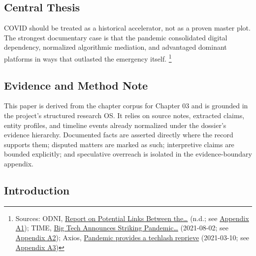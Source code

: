 \documentclass[
  american,
  11pt,
  letterpaper,
]{article}
\begin{document}
\subsection{Central Thesis}\label{central-thesis}

COVID should be treated as a historical accelerator, not as a proven
master plot. The strongest documentary case is that the pandemic
consolidated digital dependency, normalized algorithmic mediation, and
advantaged dominant platforms in ways that outlasted the emergency
itself. \footnote{Sources: ODNI,
  \href{https://www.dni.gov/files/ODNI/documents/assessments/Report-on-Potential-Links-Between-the-Wuhan-Institute-of-Virology-and-the-Origins-of-COVID-19-20230623.pdf}{Report
  on Potential Links Between the\ldots{}} (n.d.; see
  \hyperref[appendix-a1-report-on-potential-links-between-the-wuhan-institute-of-virology-and-the-origins-of-covid-19]{Appendix
  A1}); TIME,
  \href{https://time.com/6085674/big-tech-apple-microsoft-facebook-amazon-google-earnings/}{Big
  Tech Announces Striking Pandemic\ldots{}} (2021-08-02; see
  \hyperref[appendix-a2-big-tech-announces-striking-pandemic-gains-as-small-businesses-strain-to-find-their-footing]{Appendix
  A2}); Axios,
  \href{https://www.axios.com/2021/03/10/pandemic-provides-techlash-reprieve}{Pandemic
  provides a techlash reprieve} (2021-03-10; see
  \hyperref[appendix-a3-pandemic-provides-a-techlash-reprieve]{Appendix
  A3})}

\subsection{Evidence and Method Note}\label{evidence-and-method-note}

This paper is derived from the chapter corpus for Chapter 03 and is
grounded in the project's structured research OS. It relies on source
notes, extracted claims, entity profiles, and timeline events already
normalized under the dossier's evidence hierarchy. Documented facts are
asserted directly where the record supports them; disputed matters are
marked as such; interpretive claims are bounded explicitly; and
speculative overreach is isolated in the evidence-boundary appendix.

\subsection{Introduction}\label{introduction}
\end{document}
